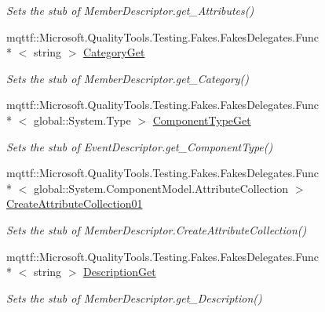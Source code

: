 \begin{DoxyCompactItemize}
\begin{DoxyCompactList}\small\item\em Sets the stub of Member\-Descriptor.\-get\-\_\-\-Attributes()\end{DoxyCompactList}\item 
mqttf\-::\-Microsoft.\-Quality\-Tools.\-Testing.\-Fakes.\-Fakes\-Delegates.\-Func\\*
$<$ string $>$ \hyperlink{class_system_1_1_component_model_1_1_fakes_1_1_stub_event_descriptor_af9f80fec9302d68930a35422ebfa9b64}{Category\-Get}
\begin{DoxyCompactList}\small\item\em Sets the stub of Member\-Descriptor.\-get\-\_\-\-Category()\end{DoxyCompactList}\item 
mqttf\-::\-Microsoft.\-Quality\-Tools.\-Testing.\-Fakes.\-Fakes\-Delegates.\-Func\\*
$<$ global\-::\-System.\-Type $>$ \hyperlink{class_system_1_1_component_model_1_1_fakes_1_1_stub_event_descriptor_a00849534b46db31f173ad767314e06dc}{Component\-Type\-Get}
\begin{DoxyCompactList}\small\item\em Sets the stub of Event\-Descriptor.\-get\-\_\-\-Component\-Type()\end{DoxyCompactList}\item 
mqttf\-::\-Microsoft.\-Quality\-Tools.\-Testing.\-Fakes.\-Fakes\-Delegates.\-Func\\*
$<$ global\-::\-System.\-Component\-Model.\-Attribute\-Collection $>$ \hyperlink{class_system_1_1_component_model_1_1_fakes_1_1_stub_event_descriptor_a0048f09bfeffd178c07e0e381c66b325}{Create\-Attribute\-Collection01}
\begin{DoxyCompactList}\small\item\em Sets the stub of Member\-Descriptor.\-Create\-Attribute\-Collection()\end{DoxyCompactList}\item 
mqttf\-::\-Microsoft.\-Quality\-Tools.\-Testing.\-Fakes.\-Fakes\-Delegates.\-Func\\*
$<$ string $>$ \hyperlink{class_system_1_1_component_model_1_1_fakes_1_1_stub_event_descriptor_aacab6845a74225209702aa209a7959b9}{Description\-Get}
\begin{DoxyCompactList}\small\item\em Sets the stub of Member\-Descriptor.\-get\-\_\-\-Description()\end{DoxyCompactList}\item 

\end{DoxyCompactItemize}
